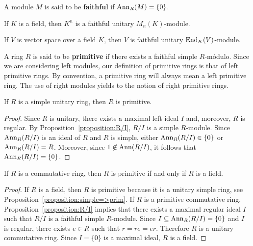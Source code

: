 

A module $M$ is said to be \textbf{faithful} if $\operatorname{Ann}_R(M)=\{0\}$. 

\begin{example}
	If $K$ is a field, then $K^n$ is a faithful unitary $M_n(K)$-module.
\end{example}

\begin{example}
	If $V$ is vector space over a field $K$, then $V$ is faithful unitary $\operatorname{End}_K(V)$-module.
\end{example}

A ring $R$ is said to be \textbf{primitive} if there exists a faithful simple $R$-módulo. Since 
we are considering left modules, our definition of primitive rings is that of left primitive rings. 
By convention, a primitive ring
will always mean a left primitive ring. 
The use 
of right modules yields to the notion of right primitive rings.  

\begin{proposition}
	\label{proposition:simple=>prim}
	If $R$ is a simple unitary ring, then $R$ is primitive. 
\end{proposition}

\begin{proof}
	Since $R$ is unitary, there exists a maximal left ideal $I$ and, moreover, $R$ is regular.
	By Proposition~\ref{proposition:R/I}, $R/I$ is a simple $R$-module. 
	Since $\operatorname{Ann}_R(R/I)$ is an ideal of $R$ and $R$ is simple, either $\operatorname{Ann}_R(R/I)\in\{0\}$ or 
	$\operatorname{Ann}_R(R/I)=R$. Moreover, since 
	$1\not\in\operatorname{Ann}(R/I)$, it follows that 
	$\operatorname{Ann}_R(R/I)=\{0\}$. 
\end{proof}

\begin{proposition}
	\label{proposition:prim+conm=cuerpo}
	If $R$ is a commutative ring, then $R$ is primitive if and only if $R$ is a field. 
\end{proposition}

\begin{proof}
	If $R$ is a field, then $R$ is primitive because it is a unitary simple ring, see  
	Proposition~\ref{proposition:simple=>prim}. If $R$ is a primitive commutative ring, Proposition~\ref{proposition:R/I} implies that there exists a maximal regular ideal $I$
	such that  
	$R/I$ is a faithful simple $R$-module. 
	Since $I\subseteq \operatorname{Ann}_R(R/I)=\{0\}$ and $I$ is regular, there exists $e\in R$ such that 
	$r=re=er$. Therefore $R$ is a unitary commutative ring. Since $I=\{0\}$ is a maximal ideal, 
	$R$ is a field. 
\end{proof}

